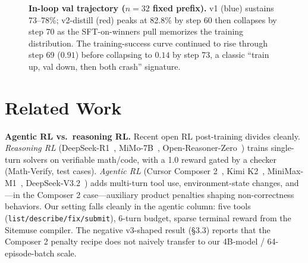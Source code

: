 \documentclass[10pt]{article}
\begin{document}
\begin{figure}[t]
\centering
{}
\caption{\textbf{In-loop val trajectory ($n{=}32$ fixed prefix).} v1 (blue)
sustains 73--78\%; v2-distill (red) peaks at 82.8\% by step 60 then
collapses by step 70 as the SFT-on-winners pull memorizes the
training distribution. The training-success curve continued to rise
through step 69 ($0.91$) before collapsing to $0.14$ by step 73, a
classic ``train up, val down, then both crash'' signature.}
\label{fig:trajectory}
\end{figure}

\section{Related Work}
\label{sec:related}

\textbf{Agentic RL vs.\ reasoning RL.} Recent open RL post-training
divides cleanly. \emph{Reasoning RL} (DeepSeek-R1~\cite{deepseek2025r1},
MiMo-7B~\cite{xiaomi2025mimo}, Open-Reasoner-Zero~\cite{hu2025orz})
trains single-turn solvers on verifiable math/code, with a 1.0 reward
gated by a checker (Math-Verify, test cases). \emph{Agentic RL}
(Cursor Composer 2~\cite{cursor2025composer2}, Kimi K2~\cite{kimi2025k2},
MiniMax-M1~\cite{minimax2025m1}, DeepSeek-V3.2~\cite{deepseek2025v32})
adds multi-turn tool use, environment-state changes, and---in the
Composer 2 case---auxiliary product penalties shaping
non-correctness behaviors. Our setting falls cleanly in the agentic
column: five tools (\texttt{list/describe/fix/submit}), 6-turn budget,
sparse terminal reward from the Sitemuse compiler. The negative
v3-shaped result (\S3.3) reports that the Composer 2 penalty recipe
does not naively transfer to our 4B-model / 64-episode-batch scale.
\end{document}
